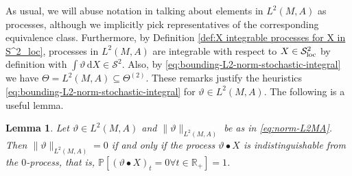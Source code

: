 \documentclass[11pt,a4paper,twoside,openany]{report}
\numberwithin{equation}{section}
\newcommand{\diff}{\mathrm{d}}
\theoremstyle{plain} %
\newtheorem{lemma}[theorem]{Lemma}
\theoremstyle{definition} %
\theoremstyle{remark} %
\begin{document}
As usual, we will abuse notation in talking about elements in \(L^2(M,A)\) as processes, although we implicitly pick representatives of the corresponding equivalence class.
 Furthermore, by  Definition \ref{def:X integrable processes for X in S^2_loc}, processes in \(L^2(M,A)\) are integrable with respect to \(X\in\mathcal{S}^2_{\rm{loc}}\) by definition with \(\int \vartheta\,\diff X\in\mathcal{S}^2\). Also, by \eqref{eq:bounding-L2-norm-stochastic-integral} we have
\(\Theta=L^2(M,A)\subseteq \Theta^{(2)}\). These remarks justify the heuristics \eqref{eq:bounding-L2-norm-stochastic-integral} for \(\vartheta\in L^2(M,A)\).
The following is a useful lemma.
\begin{lemma}\label{lemma:norm 0 implies process indistinguishable from 0}
    Let \(\vartheta\in L^2(M,A)\) and \(\lVert\vartheta\rVert_{L^2(M,A)}\) be as in \eqref{eq:norm-L2MA}. Then \(\lVert\vartheta\rVert_{L^2(M,A)}=0\) if and only if the process \(\vartheta\bullet X\) is indistinguishable from the \(0\)-process, that is, \(\mathbb{P}[(\vartheta\bullet X)_t=0\forall t\in\mathbb{R}_+]=1\).
\end{lemma}
\end{document}
